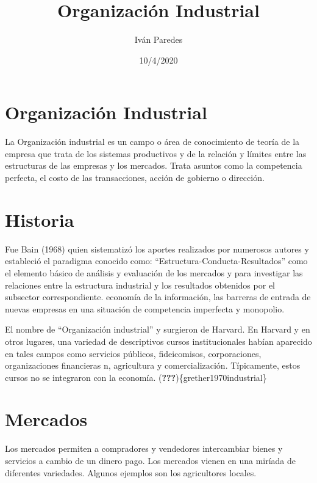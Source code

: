 \documentclass[
]{article}
\title{Organización Industrial}
\author{Iván Paredes}
\date{10/4/2020}
\begin{document}
\maketitle

{
\setcounter{tocdepth}{4}
\tableofcontents
}
\hypertarget{organizaciuxf3n-industrial}{%
\section{Organización Industrial}\label{organizaciuxf3n-industrial}}

La Organización industrial es un campo o área de conocimiento de teoría
de la empresa que trata de los sistemas productivos y de la relación y
límites entre las estructuras de las empresas y los mercados. Trata
asuntos como la competencia perfecta, el costo de las transacciones,
acción de gobierno o dirección.

\hypertarget{historia}{%
\section{Historia}\label{historia}}

Fue Bain (1968) quien sistematizó los aportes realizados por numerosos
autores y estableció el paradigma conocido como:
``Estructura-Conducta-Resultados'' como el elemento básico de análisis y
evaluación de los mercados y para investigar las relaciones entre la
estructura industrial y los resultados obtenidos por el subsector
correspondiente. economía de la información, las barreras de entrada de
nuevas empresas en una situación de competencia imperfecta y monopolio.

El nombre de ``Organización industrial'' y surgieron de Harvard. En
Harvard y en otros lugares, una variedad de descriptivos cursos
institucionales habían aparecido en tales campos como servicios
públicos, fideicomisos, corporaciones, organizaciones financieras n,
agricultura y comercialización. Típicamente, estos cursos no se
integraron con la economía. ({\textbf{???}})\{grether1970industrial\}

\hypertarget{mercados}{%
\section{Mercados}\label{mercados}}

Los mercados permiten a compradores y vendedores intercambiar bienes y
servicios a cambio de un dinero pago. Los mercados vienen en una miríada
de diferentes variedades. Algunos ejemplos son los agricultores locales.
\end{document}
